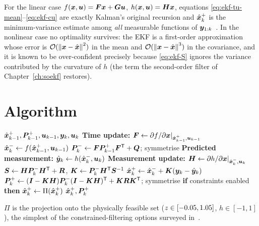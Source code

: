 For the linear case $f(\bm{x},\bm{u})=\bm{F}\bm{x}+\bm{G}\bm{u}$, $h(\bm{x},\bm{u})=\bm{H}\bm{x}$, equations
\eqref{eq:ekf-tu-mean}--\eqref{eq:ekf-cu} are exactly Kalman's original recursion and
$\hat{\bm{x}}^{+}_k$ is the minimum-variance estimate among \emph{all} measurable functions of
$\bm{y}_{1:k}$~\cite{kalman1960}. In the nonlinear case no optimality survives: the EKF is a
first-order approximation whose error is $\mathcal{O}(\left\lVert \bm{x}-\hat{\bm{x}} \right\rVert^2)$ in the mean and
$\mathcal{O}(\left\lVert \bm{x}-\hat{\bm{x}} \right\rVert^3)$ in the covariance, and it is known to be over-confident
precisely because \eqref{eq:ekf-S} ignores the variance contributed by the curvature of $h$
(the term the second-order filter of Chapter~\ref{ch:soekf} restores).

\section{Algorithm}
\begin{algorithm}[H]
\caption{EKF --- one sampling period}
\begin{algorithmic}[1]
\Require $\hat{\bm{x}}^{+}_{k-1}, \bm{P}^{+}_{k-1}, \bm{u}_{k-1}, \bm{y}_k, \bm{u}_k$
\State \textbf{Time update:} $\bm{F} \gets \partial f/\partial\bm{x} |_{\hat{\bm{x}}^{+}_{k-1},\bm{u}_{k-1}}$
\State $\hat{\bm{x}}^{-}_k \gets f(\hat{\bm{x}}^{+}_{k-1},\bm{u}_{k-1})$
\State $\bm{P}^{-}_k \gets \bm{F}\bm{P}^{+}_{k-1}\bm{F}^{\mathsf{T}} + \bm{Q}$; symmetrise
\State \textbf{Predicted measurement:} $\hat{\bm{y}}_k \gets h(\hat{\bm{x}}^{-}_k,\bm{u}_k)$
\State \textbf{Measurement update:} $\bm{H} \gets \partial h/\partial\bm{x} |_{\hat{\bm{x}}^{-}_k,\bm{u}_k}$
\State $\bm{S} \gets \bm{H}\bm{P}^{-}_k\bm{H}^{\mathsf{T}} + \bm{R}$, \quad $\bm{K} \gets \bm{P}^{-}_k\bm{H}^{\mathsf{T}}\bm{S}^{-1}$
\State $\hat{\bm{x}}^{+}_k \gets \hat{\bm{x}}^{-}_k + \bm{K}(\bm{y}_k - \hat{\bm{y}}_k)$
\State $\bm{P}^{+}_k \gets (\bm{I}-\bm{K}\bm{H})\bm{P}^{-}_k(\bm{I}-\bm{K}\bm{H})^{\mathsf{T}} + \bm{K}\bm{R}\bm{K}^{\mathsf{T}}$; symmetrise
\State \textbf{if} constraints enabled \textbf{then} $\hat{\bm{x}}^{+}_k \gets \Pi(\hat{\bm{x}}^{+}_k)$
\Ensure $\hat{\bm{x}}^{+}_k, \bm{P}^{+}_k$
\end{algorithmic}
\end{algorithm}
$\Pi$ is the projection onto the physically feasible set ($z\in[-0.05,1.05]$,
$h\in[-1,1]$), the simplest of the constrained-filtering options surveyed
in~\cite{simon2010constraints}.


